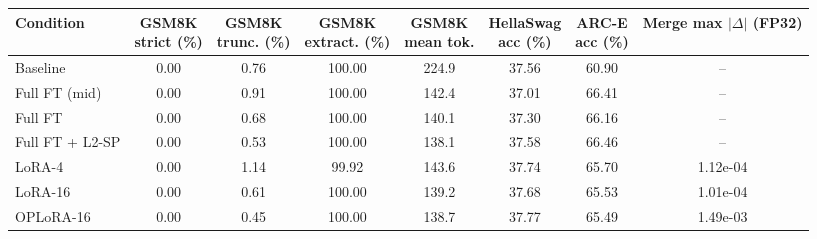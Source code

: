\begin{tabular}{lccccccc}
\toprule
Condition & \shortstack{GSM8K\\strict (\%)} & \shortstack{GSM8K\\trunc. (\%)} & \shortstack{GSM8K\\extract. (\%)} & \shortstack{GSM8K\\mean tok.} & \shortstack{HellaSwag\\acc (\%)} & \shortstack{ARC-E\\acc (\%)} & \shortstack{Merge max\\$|\Delta|$ (FP32)} \\
\midrule
Baseline & 0.00 & 0.76 & 100.00 & 224.9 & 37.56 & 60.90 & -- \\
Full FT (mid) & 0.00 & 0.91 & 100.00 & 142.4 & 37.01 & 66.41 & -- \\
Full FT & 0.00 & 0.68 & 100.00 & 140.1 & 37.30 & 66.16 & -- \\
Full FT + L2-SP & 0.00 & 0.53 & 100.00 & 138.1 & 37.58 & 66.46 & -- \\
LoRA-4 & 0.00 & 1.14 & 99.92 & 143.6 & 37.74 & 65.70 & 1.12e-04 \\
LoRA-16 & 0.00 & 0.61 & 100.00 & 139.2 & 37.68 & 65.53 & 1.01e-04 \\
OPLoRA-16 & 0.00 & 0.45 & 100.00 & 138.7 & 37.77 & 65.49 & 1.49e-03 \\
\bottomrule
\end{tabular}